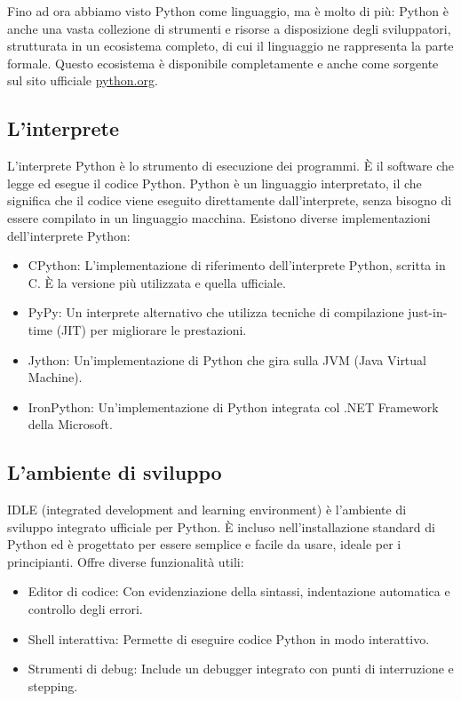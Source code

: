 \documentclass[
  letterpaper,
]{scrbook}
\providecommand{\tightlist}{%
  \setlength{\itemsep}{0pt}\setlength{\parskip}{0pt}}\usepackage{longtable,booktabs,array}
\begin{document}
Fino ad ora abbiamo visto Python come linguaggio, ma è molto di più:
Python è anche una vasta collezione di strumenti e risorse a
disposizione degli sviluppatori, strutturata in un ecosistema completo,
di cui il linguaggio ne rappresenta la parte formale. Questo ecosistema
è disponibile completamente e anche come sorgente sul sito ufficiale
\href{https://www.python.org/}{python.org}.

\subsection{L'interprete}\label{linterprete}

L'interprete Python è lo strumento di esecuzione dei programmi. È il
software che legge ed esegue il codice Python. Python è un linguaggio
interpretato, il che significa che il codice viene eseguito direttamente
dall'interprete, senza bisogno di essere compilato in un linguaggio
macchina. Esistono diverse implementazioni dell'interprete Python:

\begin{itemize}
\tightlist
\item
  CPython: L'implementazione di riferimento dell'interprete Python,
  scritta in C. È la versione più utilizzata e quella ufficiale.
\item
  PyPy: Un interprete alternativo che utilizza tecniche di compilazione
  just-in-time (JIT) per migliorare le prestazioni.
\item
  Jython: Un'implementazione di Python che gira sulla JVM (Java Virtual
  Machine).
\item
  IronPython: Un'implementazione di Python integrata col .NET Framework
  della Microsoft.
\end{itemize}

\subsection{L'ambiente di sviluppo}\label{lambiente-di-sviluppo}

IDLE (integrated development and learning environment) è l'ambiente di
sviluppo integrato ufficiale per Python. È incluso nell'installazione
standard di Python ed è progettato per essere semplice e facile da
usare, ideale per i principianti. Offre diverse funzionalità utili:

\begin{itemize}
\tightlist
\item
  Editor di codice: Con evidenziazione della sintassi, indentazione
  automatica e controllo degli errori.
\item
  Shell interattiva: Permette di eseguire codice Python in modo
  interattivo.
\item
  Strumenti di debug: Include un debugger integrato con punti di
  interruzione e stepping.
\end{itemize}
\end{document}
